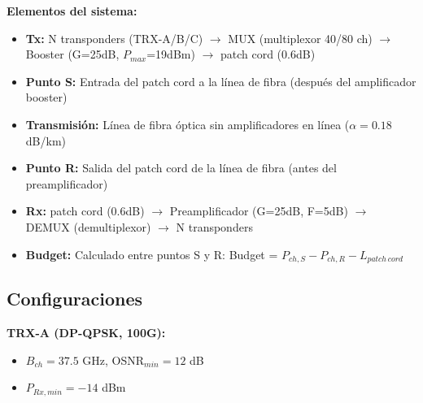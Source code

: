 \documentclass[a4paper,11pt]{article}
\begin{document}
\begin{center}
\end{center}

\vspace{0.3cm}
\textbf{Elementos del sistema:}
\begin{itemize}
    \item \textbf{Tx:} N transponders (TRX-A/B/C) $\rightarrow$ MUX (multiplexor 40/80 ch) $\rightarrow$ Booster (G=25dB, $P_{max}$=19dBm) $\rightarrow$ patch cord (0.6dB)
    \item \textbf{Punto S:} Entrada del patch cord a la línea de fibra (después del amplificador booster)
    \item \textbf{Transmisión:} Línea de fibra óptica sin amplificadores en línea ($\alpha=0.18$ dB/km)
    \item \textbf{Punto R:} Salida del patch cord de la línea de fibra (antes del preamplificador)
    \item \textbf{Rx:} patch cord (0.6dB) $\rightarrow$ Preamplificador (G=25dB, F=5dB) $\rightarrow$ DEMUX (demultiplexor) $\rightarrow$ N transponders
    \item \textbf{Budget:} Calculado entre puntos S y R: Budget = $P_{ch,S} - P_{ch,R} - L_{patch\,cord}$
\end{itemize}

\subsection*{Configuraciones}

\textbf{TRX-A (DP-QPSK, 100G):}
\begin{itemize}
    \item $B_{ch} = 37.5$ GHz, OSNR$_{min} = 12$ dB
    \item $P_{Rx,min} = -14$ dBm
\end{itemize}
\end{document}
